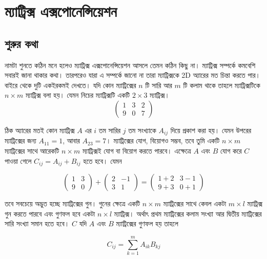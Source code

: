 \chapter{ম্যাট্রিক্স এক্সপোনেন্সিয়েশন}

\section{শুরুর কথা}

\noindent নামটা শুনতে কঠিন মনে হলেও ম্যাট্রিক্স এক্সপোনেন্সিয়েশন আসলে তেমন কঠিন কিছু না। ম্যাট্রিক্স সম্পর্কে কমবেশি সবারই জানা থাকার কথা। তারপরেও যারা এ সম্পর্কে জানো না তারা ম্যাট্রিক্সকে 2D অ্যারের মত চিন্তা করতে পার। বাইরে থেকে দুটি একইরকমই দেখতে। যদি কোন ম্যাট্রিক্সের $n$ টি সারি আর $m$ টি কলাম থাকে তাহলে ম্যাট্রিক্সটিকে $n \times m$ ম্যাট্রিক্স বলা হয়। যেমন নিচের ম্যাট্রিক্সটি একটি $2 \times 3$ ম্যাট্রিক্স।
$$
\begin{pmatrix}
1 & 3 & 2\\
9 & 0 & 7
\end{pmatrix}
$$

\noindent ঠিক অ্যারের মতই কোন ম্যাট্রিক্স $A$ এর $i$ তম সারির $j$ তম সংখ্যাকে $A_{ij}$ দিয়ে প্রকাশ করা হয়। যেমন উপরের ম্যাট্রিক্সের জন্য $A_{11} = 1$, আবার $A_{23} = 7$। ম্যাট্রিক্সের যোগ, বিয়োগও সম্ভব, তবে তুমি একটি $n \times m$ ম্যাট্রিক্সের সাথে আরেকটি $n \times m$ ম্যাট্রিক্সই যোগ বা বিয়োগ করতে পারবে। এক্ষেত্রে $A$ এবং  $B$ যোগ করে $C$ পাওয়া গেলে $C_{ij} = A_{ij} + B_{ij}$ হতে হবে। যেমন

$$
\begin{pmatrix}
1 & 3\\
9 & 0
\end{pmatrix}
+
\begin{pmatrix}
2 & -1\\
3 & 1
\end{pmatrix}
=
\begin{pmatrix}
1 + 2 & 3 - 1\\
9 + 3 & 0 + 1
\end{pmatrix}
$$

\noindent তবে সবচেয়ে অদ্ভুত হচ্ছে ম্যাট্রিক্সের গুন। গুনের ক্ষেত্রে একটি $n \times m$ ম্যাট্রিক্সের সাথে কেবল একটা $m \times l$ ম্যাট্রিক্স গুন করতে পারবে এবং  গুণফল হবে একটা $n \times l$ ম্যাট্রিক্স। অর্থাৎ প্রথম ম্যাট্রিক্সের কলাম সংখ্যা আর দ্বিতীয় ম্যাট্রিক্সের সারি সংখ্যা সমান হতে হবে। $C$ যদি $A$ এবং $B$ ম্যাট্রিক্সের গুণফল হয় তাহলে

\begin{equation}
  \label{mult:1}
  C_{ij} = \sum_{k = 1}^{m} A_{ik} B_{kj}
\end{equation}

